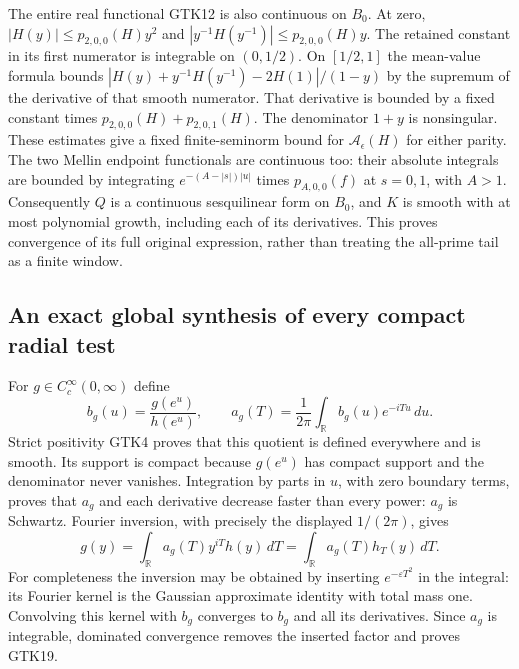 The entire real functional GTK12 is also continuous on $B_0$.
At zero,
$|H(y)|\le p_{2,0,0}(H)y^2$ and
$|y^{-1}H(y^{-1})|\le p_{2,0,0}(H)y$.
The retained constant in its first numerator is integrable
on $(0,1/2)$. On $[1/2,1]$ the mean-value formula bounds
$|H(y)+y^{-1}H(y^{-1})-2H(1)|/(1-y)$ by the supremum
of the derivative of that smooth numerator. That derivative
is bounded by a fixed constant times
$p_{2,0,0}(H)+p_{2,0,1}(H)$. The denominator $1+y$ is
nonsingular. These estimates give a fixed finite-seminorm
bound for $\mathcal A_\epsilon(H)$ for either parity.
The two Mellin endpoint functionals are continuous too:
their absolute integrals are bounded by integrating
$e^{-(A-|s|)|u|}$ times $p_{A,0,0}(f)$ at $s=0,1$,
with $A>1$.
Consequently $Q$ is a continuous sesquilinear form on $B_0$,
and $K$ is smooth with at most polynomial growth, including
each of its derivatives. This proves convergence of its full
original expression, rather than treating the all-prime tail
as a finite window.

\subsection{An exact global synthesis of every compact radial test}

For $g\in C_c^\infty(0,\infty)$ define
\begin{equation}\tag{GTK18}
 b_g(u)=\frac{g(e^u)}{h(e^u)},\qquad
 a_g(T)=\frac1{2\pi}\int_{\mathbb R}b_g(u)e^{-iTu}\,du .
\end{equation}
Strict positivity GTK4 proves that this quotient is defined
everywhere and is smooth. Its support is compact because
$g(e^u)$ has compact support and the denominator never
vanishes. Integration by parts in $u$, with zero boundary
terms, proves that $a_g$ and each derivative decrease faster
than every power: $a_g$ is Schwartz. Fourier inversion,
with precisely the displayed $1/(2\pi)$, gives
\begin{equation}\tag{GTK19}
 g(y)=\int_{\mathbb R}a_g(T)y^{iT}h(y)\,dT
                 =\int_{\mathbb R}a_g(T)h_T(y)\,dT.
\end{equation}
For completeness the inversion may be obtained by inserting
$e^{-\varepsilon T^2}$ in the integral: its Fourier kernel
is the Gaussian approximate identity with total mass one.
Convolving this kernel with $b_g$ converges to $b_g$ and all
its derivatives. Since $a_g$ is integrable, dominated
convergence removes the inserted factor and proves GTK19.

